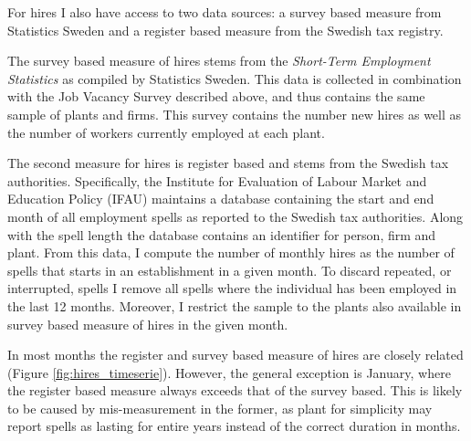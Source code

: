 For hires I also have access to two data sources: a survey based measure from Statistics Sweden and a register based measure from the Swedish tax registry. 

The survey based measure of hires stems from the \emph{Short-Term Employment Statistics} as compiled by Statistics Sweden.
This data is collected in combination with the Job Vacancy Survey described above, and thus contains the same sample of plants and firms. This survey contains the number new hires as well as the number of workers currently employed at each plant. %

The second measure for hires is register based and stems from the Swedish tax authorities. Specifically, the Institute for Evaluation of Labour Market and Education Policy (IFAU) maintains a database containing the start and end month of all employment spells as reported to the Swedish tax authorities. Along with the spell length the database contains an identifier for person, firm and plant. From this data, I compute the number of monthly hires as the number of spells that starts in an establishment in a given month. To discard repeated, or interrupted, spells I remove all spells where the individual has been employed in the last 12 months. Moreover, I restrict the sample to the plants also available in survey based measure of hires in the given month. %

In most months the register and survey based measure of hires are closely related (Figure \ref{fig:hires_timeserie}). However, the general exception is January, where the register based measure always exceeds that of the survey based. This is likely to be caused by mis-measurement in the former, as plant for simplicity may report spells as lasting for entire years instead of the correct duration in months. %




